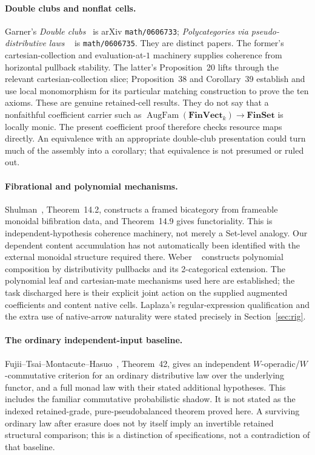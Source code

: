 \documentclass[11pt,a4paper]{article}
\theoremstyle{definition}
\newcommand{\Aug}{\operatorname{AugFam}}
\newcommand{\FinVect}{\mathbf{FinVect}}
\newcommand{\FinSet}{\mathbf{FinSet}}
\begin{document}
\paragraph{Double clubs and nonflat cells.}
Garner's \emph{Double clubs}~\cite{DoubleClubs} is arXiv
\texttt{math/0606733}; \emph{Polycategories via pseudo-distributive laws}
~\cite{Polycategories} is \texttt{math/0606735}. They are distinct papers.
The former's cartesian-collection and evaluation-at-$1$ machinery supplies
coherence from horizontal pullback stability. The latter's Proposition~20
lifts through the relevant cartesian-collection slice; Proposition~38 and
Corollary~39 establish and use local monomorphism for its particular matching
construction to prove the ten axioms. These are genuine retained-cell results.
They do not say that a nonfaithful coefficient carrier such as
$\Aug(\FinVect_k)\to\FinSet$ is locally monic. The present coefficient proof
therefore checks resource maps directly. An equivalence with an appropriate
double-club presentation could turn much of the assembly into a corollary;
that equivalence is not presumed or ruled out.

\paragraph{Fibrational and polynomial mechanisms.}
Shulman~\cite{Shulman}, Theorem~14.2, constructs a framed bicategory from
frameable monoidal bifibration data, and Theorem~14.9 gives functoriality.
This is independent-hypothesis coherence machinery, not merely a Set-level
analogy. Our dependent content accumulation has not automatically been
identified with the external monoidal structure required there. Weber
~\cite{Weber} constructs polynomial composition by distributivity pullbacks
and its 2-categorical extension. The polynomial leaf and cartesian-mate
mechanisms used here are established; the task discharged here is their
explicit joint action on the supplied augmented coefficients and content
native cells. Laplaza's regular-expression qualification and the extra use of
native-arrow naturality were stated precisely in Section~\ref{sec:rig}.

\paragraph{The ordinary independent-input baseline.}
Fujii--Tsai--Montacute--Hasuo~\cite{FTMH}, Theorem~42, gives an independent
$W$-operadic/$W$-commutative criterion for an ordinary distributive law over
the underlying functor, and a full monad law with their stated additional
hypotheses. This includes the familiar commutative probabilistic shadow.
It is not stated as the indexed retained-grade, pure-pseudobalanced theorem
proved here. A surviving ordinary law after erasure does not by itself imply
an invertible retained structural comparison; this is a distinction of
specifications, not a contradiction of that baseline.
\end{document}
